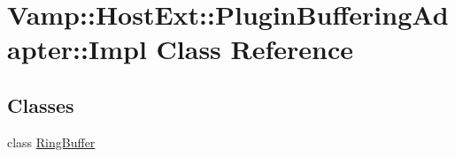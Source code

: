 \hypertarget{class_vamp_1_1_host_ext_1_1_plugin_buffering_adapter_1_1_impl}{}\section{Vamp\+:\+:Host\+Ext\+:\+:Plugin\+Buffering\+Adapter\+:\+:Impl Class Reference}
\label{class_vamp_1_1_host_ext_1_1_plugin_buffering_adapter_1_1_impl}
\subsection*{Classes}
\begin{DoxyCompactItemize}
\item 
class \hyperlink{class_vamp_1_1_host_ext_1_1_plugin_buffering_adapter_1_1_impl_1_1_ring_buffer}{Ring\+Buffer}
\end{DoxyCompactItemize}
